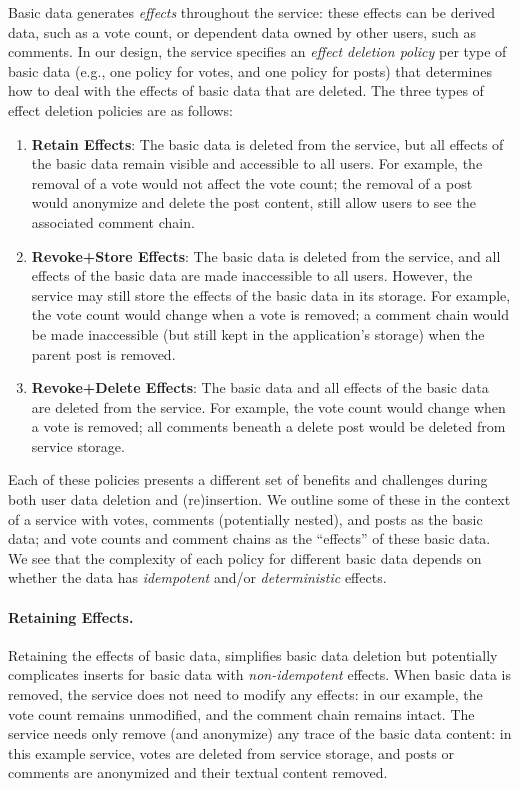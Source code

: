 \documentclass[letterpaper,twocolumn,10pt]{article}
\begin{document}
Basic data generates \emph{effects} throughout the service: these effects can be derived data, such as a vote count, or dependent data owned by other users, such as comments.
In our design, the service specifies an \emph{effect deletion policy} per type of basic data (e.g., one policy for votes, and one policy for posts) that determines how to deal with the effects of basic data that are deleted.
The three types of effect deletion policies are as follows:
\begin{enumerate}
    \item \textbf{Retain Effects}: The basic data is deleted from the service, but all effects of the basic data remain visible and accessible to all users. For example, the removal of a vote would not affect the vote count; the removal of a post would anonymize and delete the post content, still allow users to see the associated comment chain.
    \item \textbf{Revoke+Store Effects}: The basic data is deleted from the service, and all effects of the basic data are made inaccessible to all users. However, the service may still store the effects of the basic data in its storage. For example, the vote count would change when a vote is removed; a comment chain would be made inaccessible (but still kept in the application's storage) when the parent post is removed.
    \item \textbf{Revoke+Delete Effects}: The basic data and all effects of the basic data are deleted from the service. For example, the vote count would change when a vote is removed; all comments beneath a delete post would be deleted from service storage.
\end{enumerate}

Each of these policies presents a different set of benefits and challenges during both user data deletion and (re)insertion. We outline some of these in the context of a service with votes, comments (potentially nested), and posts as the basic data; and vote counts and comment chains as the ``effects'' of these basic data.
We see that the complexity of each policy for different basic data depends on whether the data has \emph{idempotent} and/or \emph{deterministic} effects. 

\paragraph{Retaining Effects.}
Retaining the effects of basic data, simplifies basic data deletion but potentially complicates inserts for basic data with \emph{non-idempotent} effects.
When basic data is removed, the service does not need to modify any effects: in our example, the vote count remains unmodified, and the comment chain remains intact. The service needs only remove (and anonymize) any trace of the basic data content: in this example service, votes are deleted from service storage, and
posts or comments are anonymized and their textual content removed.
\end{document}
